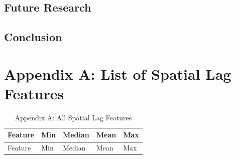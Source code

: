 \documentclass[]{article}
\begin{document}
\subsection{Future Research}\label{future-research}

\subsection{Conclusion}\label{conclusion}

\section{Appendix A: List of Spatial Lag
Features}\label{appendix-a-list-of-spatial-lag-features}

\begin{longtable}[]{@{}lllll@{}}
\caption{Appendix A: All Spatial Lag Features}\tabularnewline
\toprule
\begin{minipage}[b]{0.49\columnwidth}\raggedright\strut
Feature\strut
\end{minipage} & \begin{minipage}[b]{0.08\columnwidth}\raggedright\strut
Min\strut
\end{minipage} & \begin{minipage}[b]{0.09\columnwidth}\raggedright\strut
Median\strut
\end{minipage} & \begin{minipage}[b]{0.09\columnwidth}\raggedright\strut
Mean\strut
\end{minipage} & \begin{minipage}[b]{0.11\columnwidth}\raggedright\strut
Max\strut
\end{minipage}\tabularnewline
\midrule
\endfirsthead
\toprule
\begin{minipage}[b]{0.49\columnwidth}\raggedright\strut
Feature\strut
\end{minipage} & \begin{minipage}[b]{0.08\columnwidth}\raggedright\strut
Min\strut
\end{minipage} & \begin{minipage}[b]{0.09\columnwidth}\raggedright\strut
Median\strut
\end{minipage} & \begin{minipage}[b]{0.09\columnwidth}\raggedright\strut
Mean\strut
\end{minipage} & \begin{minipage}[b]{0.11\columnwidth}\raggedright\strut
Max\strut
\end{minipage}\tabularnewline

\end{longtable}
\end{document}
